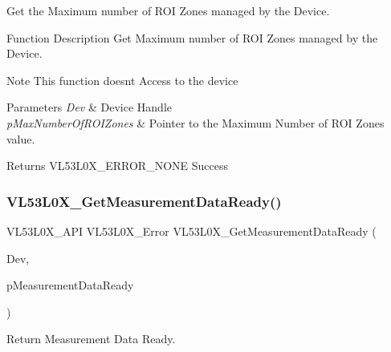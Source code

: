 Get the Maximum number of R\+OI Zones managed by the Device. 

\begin{DoxyParagraph}{Function Description}
Get Maximum number of R\+OI Zones managed by the Device.
\end{DoxyParagraph}
\begin{DoxyNote}{Note}
This function doesn\textquotesingle{}t Access to the device
\end{DoxyNote}

\begin{DoxyParams}{Parameters}
{\em Dev} & Device Handle \\
\hline
{\em p\+Max\+Number\+Of\+R\+O\+I\+Zones} & Pointer to the Maximum Number of R\+OI Zones value. \\
\hline
\end{DoxyParams}
\begin{DoxyReturn}{Returns}
V\+L53\+L0\+X\+\_\+\+E\+R\+R\+O\+R\+\_\+\+N\+O\+NE Success 
\end{DoxyReturn}
\mbox{\label{group__VL53L0X__measurement__group_ga0052a146d166a0816ab696afda87ff49}} 
\subsubsection{\texorpdfstring{V\+L53\+L0\+X\+\_\+\+Get\+Measurement\+Data\+Ready()}{VL53L0X\_GetMeasurementDataReady()}}
{\footnotesize\ttfamily V\+L53\+L0\+X\+\_\+\+A\+PI V\+L53\+L0\+X\+\_\+\+Error V\+L53\+L0\+X\+\_\+\+Get\+Measurement\+Data\+Ready (\begin{DoxyParamCaption}\item[{\hyperlink{group__VL53L0X__platform__group_ga2d6405308b1dd524b462f1b8fb97d167}{V\+L53\+L0\+X\+\_\+\+D\+EV}}]{Dev,  }\item[{\hyperlink{vl53l0x__types_8h_aba7bc1797add20fe3efdf37ced1182c5}{uint8\+\_\+t} $\ast$}]{p\+Measurement\+Data\+Ready }\end{DoxyParamCaption})}



Return Measurement Data Ready. 

